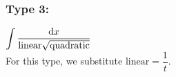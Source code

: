 \documentclass[14]{article}
\theoremstyle{definition}
\theoremstyle{case}
\begin{document}
\subsubsection{Type 3:}
$\displaystyle \int \dfrac{\dif x}{\text{linear} \sqrt{\text{quadratic}}}$\\
For this type, we substitute $\text{linear} = \dfrac1t$.                                                                                                                                                                                                                                                                                                                                                                                                                                                                                                                                                                                                                                                                                                                                                                                                                                                                                                                                                                                                                                                                                                                                                                                                                                                                                                                                                                                                                                                                                                                                                                                                                                                                                                                                                                                                                                                                                                                                                                                                                                                                                                                                                                                                                                 
\end{document}

